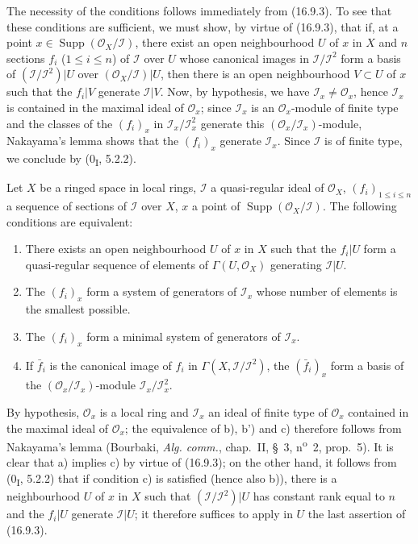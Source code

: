 The necessity of the conditions follows immediately from (16.9.3). To see that
these conditions are sufficient, we must show, by virtue of (16.9.3), that if,
at a point $x\in\operatorname{Supp}(\mathcal{O}_X/\mathscr{I})$, there exist
an open neighbourhood $U$ of $x$ in $X$ and $n$ sections $f_i$
($1\leq i\leq n$) of $\mathscr{I}$ over $U$ whose canonical images in
$\mathscr{I}/\mathscr{I}^2$ form a basis of
$(\mathscr{I}/\mathscr{I}^2)|U$ over
$(\mathcal{O}_X/\mathscr{I})|U$, then there is an open neighbourhood
$V\subset U$ of $x$ such that the $f_i|V$ generate $\mathscr{I}|V$. Now, by
hypothesis, we have $\mathscr{I}_x\neq\mathcal{O}_x$, hence $\mathscr{I}_x$
is contained in the maximal ideal of $\mathcal{O}_x$; since $\mathscr{I}_x$
is an $\mathcal{O}_x$-module of finite type and the classes of the $(f_i)_x$
in $\mathscr{I}_x/\mathscr{I}_x^2$ generate this
$(\mathcal{O}_x/\mathscr{I}_x)$-module, Nakayama's lemma shows that the
$(f_i)_x$ generate $\mathscr{I}_x$. Since $\mathscr{I}$ is of finite type,
we conclude by (0\textsubscript{I}, 5.2.2).

\begin{corollary}[16.9.5]
\label{IV.16.9.5}
Let $X$ be a ringed space in local rings, $\mathscr{I}$ a quasi-regular
ideal of $\mathcal{O}_X$, $(f_i)_{1\leq i\leq n}$ a sequence of
sections of $\mathscr{I}$ over $X$,
$x$ a point of $\operatorname{Supp}(\mathcal{O}_X/\mathscr{I})$. The
following conditions are equivalent:
\begin{enumerate}
  \item[(a)] There exists an open neighbourhood $U$ of $x$ in $X$ such that
  the $f_i|U$ form a quasi-regular sequence of elements of
  $\Gamma(U,\mathcal{O}_X)$ generating $\mathscr{I}|U$.
  \item[(b)] The $(f_i)_x$ form a system of generators of
  $\mathscr{I}_x$ whose number of elements is the smallest possible.
  \item[(b')] The $(f_i)_x$ form a minimal system of generators of
  $\mathscr{I}_x$.
  \item[(c)] If $\bar f_i$ is the canonical image of $f_i$ in
  $\Gamma(X,\mathscr{I}/\mathscr{I}^2)$, the $(\bar f_i)_x$ form a basis
  of the $(\mathcal{O}_x/\mathscr{I}_x)$-module
  $\mathscr{I}_x/\mathscr{I}_x^2$.
\end{enumerate}
\end{corollary}

By hypothesis, $\mathcal{O}_x$ is a local ring and $\mathscr{I}_x$ an ideal
of finite type of $\mathcal{O}_x$ contained in the maximal ideal of
$\mathcal{O}_x$; the equivalence of b), b') and c) therefore follows from
Nakayama's lemma (Bourbaki, \emph{Alg. comm.}, chap.~II, §~3,
n\textsuperscript{o}~2, prop.~5). It is clear that a) implies c) by virtue
of (16.9.3); on the other hand, it follows from (0\textsubscript{I}, 5.2.2)
that if condition c) is satisfied (hence also b)), there is a neighbourhood
$U$ of $x$ in $X$ such that $(\mathscr{I}/\mathscr{I}^2)|U$ has constant rank
equal to $n$ and the $f_i|U$ generate $\mathscr{I}|U$; it therefore suffices
to apply in $U$ the last assertion of (16.9.3).

